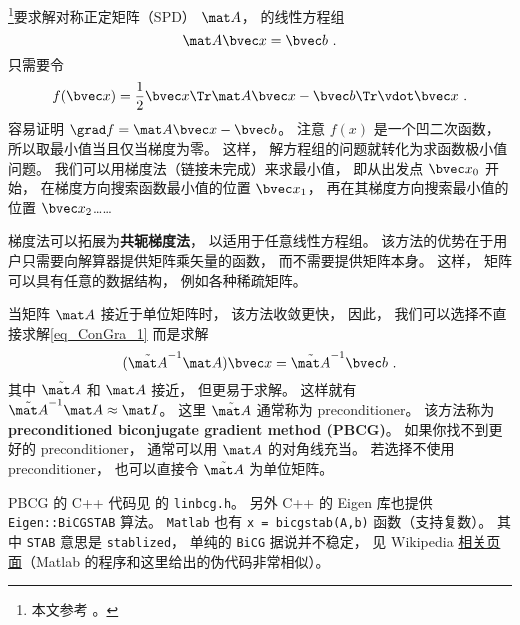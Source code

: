 
\begin{issues}
\issueDraft
\end{issues}


\footnote{本文参考 \cite{NR3}。}要求解对称正定矩阵（SPD） $\mat A$， 的线性方程组
\begin{equation}\label{eq_ConGra_1}
\mat A \bvec x = \bvec b~.
\end{equation}
只需要令
\begin{equation}
f(\bvec x) = \frac{1}{2}\bvec x\Tr \mat A\bvec x - \bvec b\Tr \vdot \bvec x~.
\end{equation}
容易证明 $\grad f = \mat A \bvec x - \bvec b$。 注意 $f(x)$ 是一个凹二次函数， 所以取最小值当且仅当梯度为零。 这样， 解方程组的问题就转化为求函数极小值问题。 我们可以用梯度法（链接未完成）来求最小值， 即从出发点 $\bvec x_0$ 开始， 在梯度方向搜索函数最小值的位置 $\bvec x_1$， 再在其梯度方向搜索最小值的位置 $\bvec x_2$……

梯度法可以拓展为\textbf{共轭梯度法}， 以适用于任意线性方程组。 该方法的优势在于用户只需要向解算器提供矩阵乘矢量的函数， 而不需要提供矩阵本身。 这样， 矩阵可以具有任意的数据结构， 例如各种稀疏矩阵。

当矩阵 $\mat A$ 接近于单位矩阵时， 该方法收敛更快， 因此， 我们可以选择不直接求解\autoref{eq_ConGra_1} 而是求解
\begin{equation}
(\tilde {\mat A}^{-1}\mat A) \bvec x = \tilde {\mat A}^{-1}\bvec b~.
\end{equation}
其中 $\tilde {\mat A}$ 和 $\mat A$ 接近， 但更易于求解。 这样就有 $\tilde {\mat A}^{-1}\mat A \approx \mat I$。 这里 $\tilde {\mat A}$ 通常称为 preconditioner。 该方法称为 \textbf{preconditioned biconjugate gradient method (PBCG)}。 如果你找不到更好的 preconditioner， 通常可以用 $\mat A$ 的对角线充当。 若选择不使用 preconditioner， 也可以直接令 $\tilde {\mat A}$ 为单位矩阵。

PBCG 的 C++ 代码见 \cite{NR3} 的 \verb|linbcg.h|。 另外 C++ 的 Eigen 库也提供 \verb|Eigen::BiCGSTAB| 算法。 \verb|Matlab| 也有 \verb|x = bicgstab(A,b)| 函数（支持复数）。 其中 \verb|STAB| 意思是 \verb|stablized|， 单纯的 \verb|BiCG| 据说并不稳定， 见 Wikipedia \href{https://en.wikipedia.org/wiki/Biconjugate_gradient_stabilized_method}{相关页面}（Matlab 的程序和这里给出的伪代码非常相似）。
